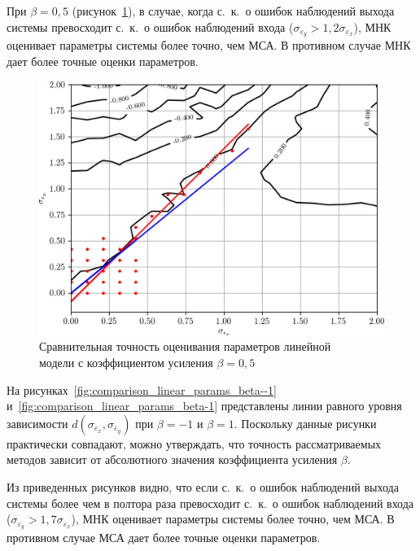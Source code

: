 При \( \beta = 0{,}5 \) (рисунок~\ref{fig:comparison_linear_params_beta-0,5}),
в случае, когда с.~к.~о ошибок наблюдений выхода системы превосходит
с.~к.~о ошибок наблюдений входа (\(\sigma_{\varepsilon_y} > 1{,}2 \sigma_{\varepsilon_x}\)),
МНК оценивает параметры системы более точно, чем МСА.
В противном случае МНК дает более точные оценки параметров.

\begin{figure}[h]
  \centering
  \includegraphics[width=135mm]{fig/linear/param/beta-0,5_param-accs-approx.png}
  \caption{%
    Сравнительная точность оценивания параметров линейной \\
    модели с коэффициентом усиления \( \beta = 0{,}5 \)
  }\label{fig:comparison_linear_params_beta-0,5}
\end{figure}

На рисунках~\ref{fig:comparison_linear_params_beta--1} и~\ref{fig:comparison_linear_params_beta-1}
представлены линии равного уровня зависимости \( d(\sigma_{\varepsilon_x}, \sigma_{\varepsilon_y}) \)
при \( \beta = -1 \) и \( \beta = 1 \).
Поскольку данные рисунки практически совпадают, можно утверждать, что точность рассматриваемых методов
зависит от абсолютного значения коэффициента усиления \( \beta \).

Из приведенных рисунков видно, что если с.~к.~о ошибок наблюдений выхода системы
более чем в полтора раза превосходит с.~к.~о ошибок наблюдений входа
(\( \sigma_{\varepsilon_y} > 1{,}7 \sigma_{\varepsilon_x} \)),
МНК оценивает параметры системы более точно, чем МСА.
В противном случае МСА дает более точные оценки параметров.

